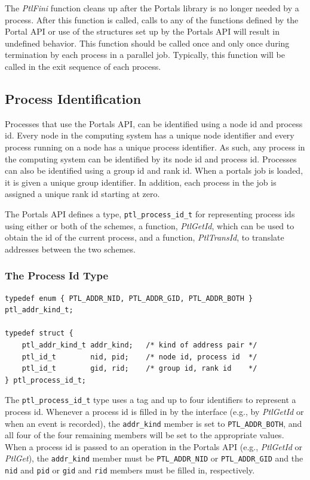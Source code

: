 \documentclass{sand-report}
\begin{document}
\noindent
The \emph{PtlFini} function cleans up after the Portals library is no
longer needed by a process.  After this function is called, calls to
any of the functions defined by the Portal API or use of the
structures set up by the Portals API will result in undefined
behavior.  This function should be called once and only once during
termination by each process in a parallel job.  Typically, this
function will be called in the exit sequence of each process.

\subsection{Process Identification}\label{sec:pid}

Processes that use the Portals API, can be identified using a node id
and process id.  Every node in the computing system has a unique node
identifier and every process running on a node has a unique process
identifier.  As such, any process in the computing system can be
identified by its node id and process id.  Processes can also be
identified using a group id and rank id.  When a portals job is
loaded, it is given a unique group identifier. In addition, each
process in the job is assigned a unique rank id starting at zero.

The Portals API defines a type, \texttt{ptl_process_id_t} for
representing process ids using either or both of the schemes, a
function, \emph{PtlGetId}, which can be used to obtain the id of the
current process, and a function, \emph{PtlTransId}, to translate
addresses between the two schemes.

\subsubsection{The Process Id Type}\label{sec:pid-type}
\begin{verbatim}
typedef enum { PTL_ADDR_NID, PTL_ADDR_GID, PTL_ADDR_BOTH } ptl_addr_kind_t;

typedef struct {
    ptl_addr_kind_t addr_kind;   /* kind of address pair */
    ptl_id_t        nid, pid;    /* node id, process id  */
    ptl_id_t        gid, rid;    /* group id, rank id    */
} ptl_process_id_t;
\end{verbatim}

\noindent
The \texttt{ptl_process_id_t} type uses a tag and up to four
identifiers to represent a process id.  Whenever a process id is
filled in by the interface (e.g., by \emph{PtlGetId} or when an event
is recorded), the \texttt{addr_kind} member is set to
\texttt{PTL_ADDR_BOTH}, and all four of the four remaining members
will be set to the appropriate values.  When a process id is passed to
an operation in the Portals API (e.g., \emph{PtlGetId} or
\emph{PtlGet}), the \texttt{addr_kind} member must be
\texttt{PTL_ADDR_NID} or \texttt{PTL_ADDR_GID} and the \texttt{nid}
and \texttt{pid} or \texttt{gid} and \texttt{rid} members must be
filled in, respectively.
\end{document}
